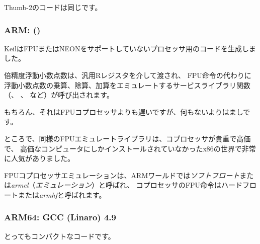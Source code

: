 Thumb-2のコードは同じです。

\subsubsection{ARM: \OptimizingKeilVI (\ThumbMode)}



KeilはFPUまたはNEONをサポートしていないプロセッサ用のコードを生成しました。

倍精度浮動小数点数は、汎用Rレジスタを介して渡され、
FPU命令の代わりに浮動小数点数の乗算、除算、加算をエミュレートするサービスライブラリ関数
（、 、 など）が呼び出されます。

もちろん、それはFPUコプロセッサよりも遅いですが、何もないよりはましです。

ところで、同様のFPUエミュレートライブラリは、コプロセッサが貴重で高価で、
高価なコンピュータにしかインストールされていなかったx86の世界で非常に人気がありました。


FPUコプロセッサエミュレーションは、ARMワールドでは\emph{ソフトフロート}または\emph{armel}（\emph{エミュレーション}）と呼ばれ、
コプロセッサのFPU命令はハードフロートまたは\emph{armhf}と呼ばれます。

\iffalse
\myindex{Raspberry Pi}

For example, the Linux kernel for Raspberry Pi is compiled in two variants.

In the \emph{soft float} case, arguments are passed via R-registers, and in the \emph{hard float} case---via D-registers.

And that is what stops you from using armhf-libraries from armel-code or vice versa,
and that is why all the code in Linux distributions must be compiled according to a single convention.
\fi

\subsubsection{ARM64: \Optimizing GCC (Linaro) 4.9}

とってもコンパクトなコードです。



